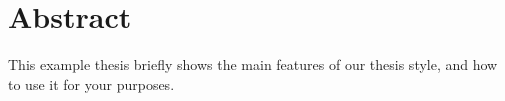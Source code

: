 \chapter*{Abstract}
  This example thesis briefly shows the main features of our thesis
  style, and how to use it for your purposes.
